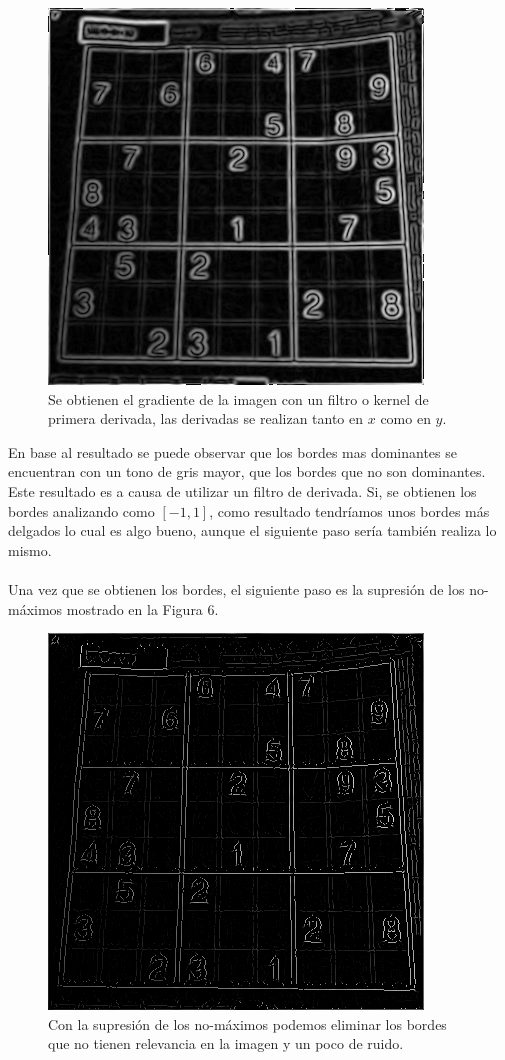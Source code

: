 \documentclass[conference]{IEEEtran}
\begin{document}
\begin{figure}[h]
	\setlength{\unitlength}{0.105in}
	\centering
	\includegraphics[scale=0.60]{./images/13sudokuEdges.png}
	\caption{Se obtienen el gradiente de la imagen con un filtro o kernel de primera derivada, las derivadas se realizan tanto en $x$ como en $y$.}
\end{figure}
En base al resultado se puede observar que los bordes mas dominantes se encuentran con un tono de gris mayor, que los bordes que no son dominantes. Este resultado es a causa de utilizar un filtro de derivada. Si, se obtienen los bordes analizando como $[-1, 1]$, como resultado tendr\'iamos unos bordes m\'as delgados lo cual es algo bueno, aunque el siguiente paso ser\'ia tambi\'en realiza lo mismo.\\\\

Una vez que se obtienen los bordes, el siguiente paso es la supresi\'on de los no-m\'aximos mostrado en la Figura 6.

\begin{figure}[h]
	\setlength{\unitlength}{0.105in}
	\centering	
	\includegraphics[scale=0.60]{./images/14sudokuSupression.png}
	\caption{Con la supresi\'on de los no-m\'aximos podemos eliminar los bordes que no tienen relevancia en la imagen y un poco de ruido.}
\end{figure}
\end{document}
